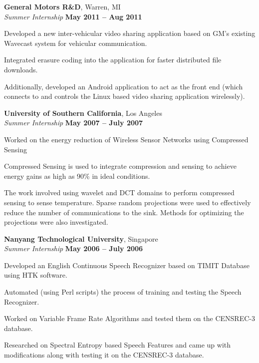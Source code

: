 \documentclass[margin,line]{resume}
\begin{document}
\begin{resume}
    \textbf{General Motors R\&D}, Warren, MI\\%
    \textsl{Summer Internship} \hfill \textbf{May 2011 -- Aug 2011}
    \begin{list2}
    \item Developed a new inter-vehicular video sharing application based on GM's existing Wavecast system for vehicular communication.
    \item Integrated erasure coding into the application for faster distributed file downloads. 
    \item Additionally, developed an Android application to act as the front end (which connects to and controls the Linux based video sharing application wirelessly).
    \end{list2}
    

    \textbf{University of Southern California}, Los Angeles\\%
    \textsl{Summer Internship} \hfill \textbf{May 2007 -- July 2007}
    \begin{list2}
    \item Worked on the energy reduction of Wireless Sensor Networks using Compressed Sensing
    \item Compressed Sensing is used to integrate compression and sensing to achieve energy gains as high as 90\% in ideal conditions.
    \item The work involved using wavelet and DCT domains to perform compressed sensing to sense temperature. Sparse random projections were used to effectively reduce the number of communications to the sink. Methods for optimizing the projections were also investigated.     
    \end{list2}
    
    \textbf{Nanyang Technological University}, Singapore \\%
    \textsl{Summer Internship} \hfill \textbf{May 2006 -- July 2006}
    \begin{list2}
    \item Developed an English Continuous Speech Recognizer based on TIMIT Database using HTK software.
    \item Automated (using Perl scripts) the process of training and testing the Speech Recognizer.
    \item Worked on Variable Frame Rate Algorithms and tested them on the CENSREC-3 database.
    \item Researched on Spectral Entropy based Speech Features and came up with modifications along with testing it on the CENSREC-3 database.
    \end{list2}
    



\end{resume}
\end{document}
